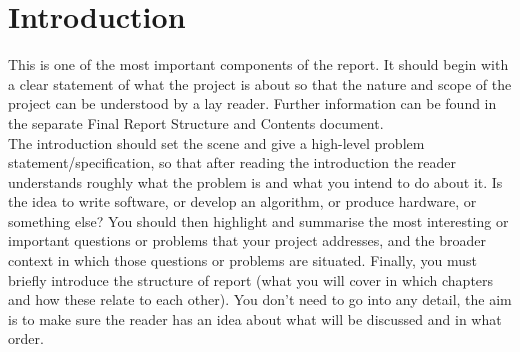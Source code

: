 \section{Introduction}
This is one of the most important
components of the report. It should begin with a
clear statement of what the project is about so
that the nature and scope of the project can be
understood by a lay reader. Further information can be found in the separate
Final Report Structure and Contents document.\\ \newline \noindent The introduction should set the scene and give a high-level problem statement/specification, so that after
reading the introduction the reader understands
roughly what the problem is and what you intend to
do about it. Is the idea to write software, or develop
an algorithm, or produce hardware, or something
else?
You should then highlight and summarise the most
interesting or important questions or problems that
your project addresses, and the broader context in
which those questions or problems are situated.
Finally, you must briefly introduce the structure of
report (what you will cover in which chapters and how
these relate to each other). You don't need to go into
any detail, the aim is to make sure the reader has an
idea about what will be discussed and in what order.
